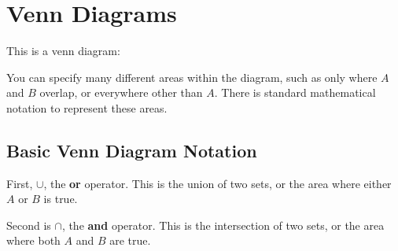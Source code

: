 \documentclass{report}
\begin{document}


\chapter{Venn Diagrams}

This is a venn diagram:

\def\circleA{(180:1.75cm) circle (2.5cm)}
\def\circleB{(0:1.75cm) circle (2.5cm)}
\def\rectangleU{(5,-3) rectangle (-5,3)}
\def\circleAthree{(150:1.75cm) circle (2.5cm)}
\def\circleBthree{(30:1.75cm) circle (2.5cm)}
\def\circleCthree{(270:1.75cm) circle (2.5cm)}
\def\rectangleUthree{(5,-5) rectangle (-5,5)}

You can specify many different areas within the diagram, such as only where $A$ and $B$ overlap, or everywhere other than $A$. There is standard mathematical notation to represent these areas.

\section{Basic Venn Diagram Notation}

First, $\cup$, the \textbf{or} operator. This is the union of two sets, or the area where either $A$ or $B$ is true.


\pagebreak

Second is $\cap$, the \textbf{and} operator. This is the intersection of two sets, or the area where both $A$ and $B$ are true.

\end{document}
